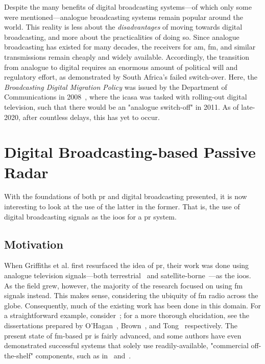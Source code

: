 \documentclass[class=report,11pt,crop=false]{standalone}
\begin{document}
Despite the many benefits of digital broadcasting systems---of which only some were mentioned---analogue broadcasting systems remain popular around the world. This reality is less about the \emph{disadvantages} of moving towards digital broadcasting, and more about the practicalities of doing so. Since analogue broadcasting has existed for many decades, the receivers for \gls{am}, \gls{fm}, and similar transmissions remain cheaply and widely available. Accordingly, the transition from analogue to digital requires an enormous amount of political will and regulatory effort, as demonstrated by South Africa's failed switch-over. Here, the \emph{Broadcasting Digital Migration Policy} was issued by the Department of Communications in 2008~\cite{icasaNotice2008}, where the \gls{icasa} was tasked with rolling-out digital television, such that there would be an "analogue switch-off" in 2011. As of late-2020, after countless delays, this has yet to occur.

\section{Digital Broadcasting-based Passive Radar}
With the foundations of both \gls{pr} and digital broadcasting presented, it is now interesting to look at the use of the latter in the former. That is, the use of digital broadcasting signals as the \gls{ioo}s for a \gls{pr} system.

\subsection{Motivation}
When Griffiths et al. first resurfaced the idea of \gls{pr}, their work was done using analogue television signals---both terrestrial~\cite{Griffiths1986} and satellite-borne~\cite{Griffiths1992}---as the \gls{ioo}s. As the field grew, however, the majority of the research focused on using \gls{fm} signals instead. This makes sense, considering the ubiquity of \gls{fm} radio across the globe. Consequently, much of the existing work has been done in this domain. For a straightforward example, consider~\cite{OHagan2007}; for a more thorough elucidation, see the dissertations prepared by O'Hagan~\cite{o2009passive}, Brown~\cite{brown2013fm}, and Tong~\cite{tong2014} respectively. The present state of \gls{fm}-based \gls{pr} is fairly advanced, and some authors have even demonstrated successful systems that solely use readily-available, "commercial off-the-shelf" components, such as in~\cite{Tong2015} and~\cite{Moser2019}.
\end{document}
